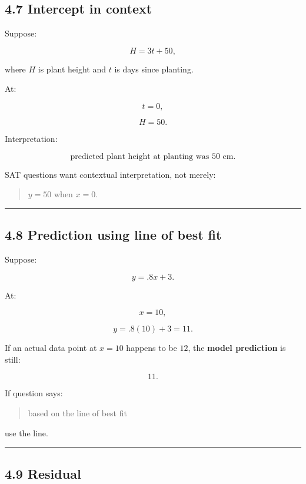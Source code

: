 \documentclass[
]{article}
\begin{document}
\subsection{4.7 Intercept in context}\label{intercept-in-context}

Suppose:

\[
H=3t+50,
\]

where \(H\) is plant height and \(t\) is days since planting.

At:

\[
t=0,
\]

\[
H=50.
\]

Interpretation:

\[
\boxed{\text{predicted plant height at planting was 50 cm}}.
\]

SAT questions want contextual interpretation, not merely:

\begin{quote}
\(y=50\) when \(x=0\).
\end{quote}

\begin{center}\rule{0.5\linewidth}{0.5pt}\end{center}

\subsection{4.8 Prediction using line of best
fit}\label{prediction-using-line-of-best-fit}

Suppose:

\[
y=.8x+3.
\]

At:

\[
x=10,
\]

\[
y=.8(10)+3=11.
\]

If an actual data point at \(x=10\) happens to be \(12\), the
\textbf{model prediction} is still:

\[
\boxed{11}.
\]

If question says:

\begin{quote}
based on the line of best fit
\end{quote}

use the line.

\begin{center}\rule{0.5\linewidth}{0.5pt}\end{center}

\subsection{4.9 Residual}\label{residual}
\end{document}
